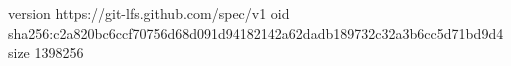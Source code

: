 version https://git-lfs.github.com/spec/v1
oid sha256:c2a820bc6ccf70756d68d091d94182142a62dadb189732c32a3b6cc5d71bd9d4
size 1398256
